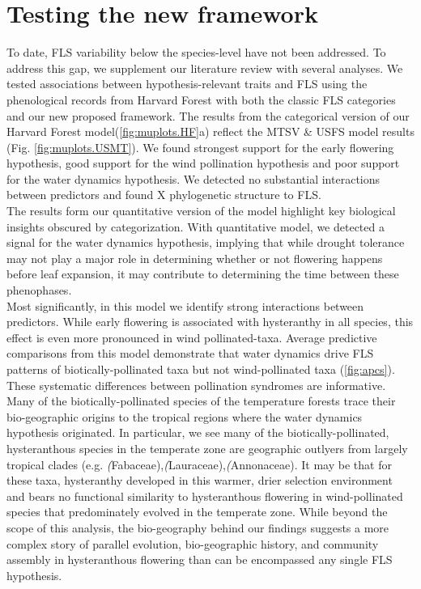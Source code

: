 \documentclass{article}
\begin{document}
{\section*{Testing the new framework}

To date, FLS variability below the species-level have not been addressed. To address this gap, we supplement our literature review with several analyses. We tested associations between hypothesis-relevant traits and FLS using the phenological records from Harvard Forest with both the classic FLS categories and our new proposed framework. The results from the categorical version of our Harvard Forest model(\ref{fig:muplots.HF}a) reflect the MTSV & USFS model results (Fig. \ref{fig:muplots.USMT}). We found strongest support for the early flowering hypothesis, good support for the wind pollination hypothesis and poor support for the water dynamics hypothesis. We detected no substantial interactions between predictors and found X phylogenetic structure to FLS. \\

\noindent The results form our quantitative version of the model highlight key biological insights obscured by categorization. With quantitative model, we detected a signal for the water dynamics hypothesis, implying that while drought tolerance may not play a major role in determining whether or not flowering happens before leaf expansion, it may contribute to determining the time between these phenophases.\\

\noindent Most significantly, in this model we identify strong interactions between predictors. While early flowering is associated with hysteranthy in all species, this effect is even more pronounced in wind pollinated-taxa. Average predictive comparisons from this model demonstrate that water dynamics drive FLS patterns of biotically-pollinated taxa but not wind-pollinated taxa (\ref{fig:apcs}). These systematic differences between pollination syndromes are informative. Many of the biotically-pollinated species of the temperature forests trace their bio-geographic origins to the tropical regions \citep{Daubenmire1972} where the water dynamics hypothesis originated\citep{Janzen1967,Franklin2016}. In particular, we see many of the biotically-pollinated, hysteranthous species in the temperate zone are geographic outlyers from largely tropical clades (e.g. \textit(Fabaceae),\textit(Lauraceae),\textit(Annonaceae). It may be that for these taxa, hysteranthy developed in this warmer, drier selection environment and bears no functional similarity to hysteranthous flowering in wind-pollinated species that predominately evolved in the temperate zone. While beyond the scope of this analysis, the bio-geography behind our findings suggests a more complex story of parallel evolution, bio-geographic history, and community assembly in hysteranthous flowering than can be encompassed any single FLS hypothesis.\\

}
\end{document}
